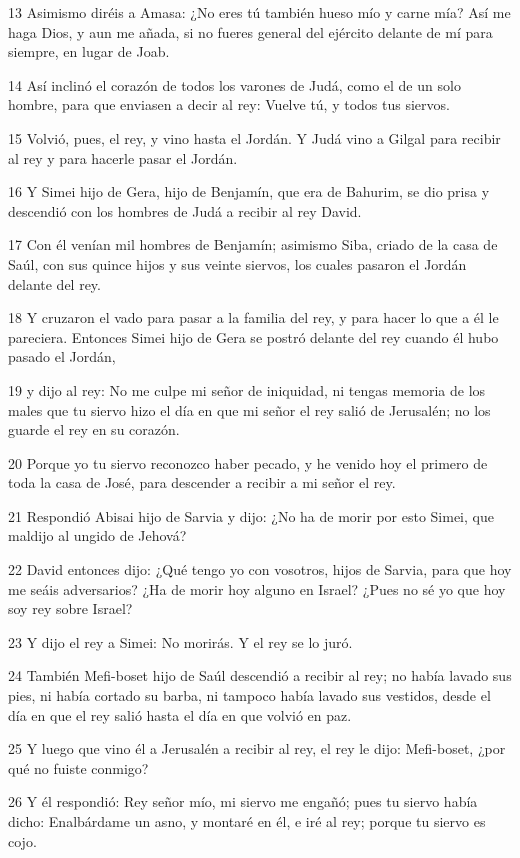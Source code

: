 \par 13 Asimismo diréis a Amasa: ¿No eres tú también hueso mío y carne mía? Así me haga Dios, y aun me añada, si no fueres general del ejército delante de mí para siempre, en lugar de Joab.
\par 14 Así inclinó el corazón de todos los varones de Judá, como el de un solo hombre, para que enviasen a decir al rey: Vuelve tú, y todos tus siervos.
\par 15 Volvió, pues, el rey, y vino hasta el Jordán. Y Judá vino a Gilgal para recibir al rey y para hacerle pasar el Jordán.
\par 16 Y Simei hijo de Gera, hijo de Benjamín, que era de Bahurim, se dio prisa y descendió con los hombres de Judá a recibir al rey David.
\par 17 Con él venían mil hombres de Benjamín; asimismo Siba, criado de la casa de Saúl, con sus quince hijos y sus veinte siervos, los cuales pasaron el Jordán delante del rey.
\par 18 Y cruzaron el vado para pasar a la familia del rey, y para hacer lo que a él le pareciera. Entonces Simei hijo de Gera se postró delante del rey cuando él hubo pasado el Jordán, 
\par 19 y dijo al rey: No me culpe mi señor de iniquidad, ni tengas memoria de los males que tu siervo hizo el día en que mi señor el rey salió de Jerusalén; no los guarde el rey en su corazón.
\par 20 Porque yo tu siervo reconozco haber pecado, y he venido hoy el primero de toda la casa de José, para descender a recibir a mi señor el rey.
\par 21 Respondió Abisai hijo de Sarvia y dijo: ¿No ha de morir por esto Simei, que maldijo al ungido de Jehová?
\par 22 David entonces dijo: ¿Qué tengo yo con vosotros, hijos de Sarvia, para que hoy me seáis adversarios? ¿Ha de morir hoy alguno en Israel? ¿Pues no sé yo que hoy soy rey sobre Israel?
\par 23 Y dijo el rey a Simei: No morirás. Y el rey se lo juró.
\par 24 También Mefi-boset hijo de Saúl descendió a recibir al rey; no había lavado sus pies, ni había cortado su barba, ni tampoco había lavado sus vestidos, desde el día en que el rey salió hasta el día en que volvió en paz.
\par 25 Y luego que vino él a Jerusalén a recibir al rey, el rey le dijo: Mefi-boset, ¿por qué no fuiste conmigo?
\par 26 Y él respondió: Rey señor mío, mi siervo me engañó; pues tu siervo había dicho: Enalbárdame un asno, y montaré en él, e iré al rey; porque tu siervo es cojo.
